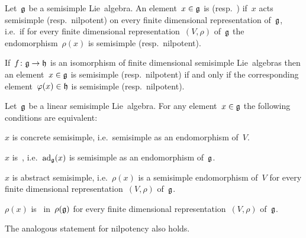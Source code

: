 \begin{definition}
  Let~$\mathfrak{g}$ be a semisimple Lie~algebra.
  An element~$x \in \mathfrak{g}$ is  (resp.\ ) if~$x$ acts semisimple (resp.\ nilpotent) on every finite dimensional representation of~$\mathfrak{g}$, i.e.\ if for every finite dimensional representation~$(V,\rho)$ of~$\mathfrak{g}$ the endomorphism~$\rho(x)$ is semisimple (resp.\ nilpotent).
\end{definition}


\begin{remark}
  If~$f \colon \mathfrak{g} \to \mathfrak{h}$ is an isomorphism of finite dimensional semisimple Lie~algebras then an element~$x \in \mathfrak{g}$ is semisimple (resp.\ nilpotent) if and only if the corresponding element~$\varphi(x) \in \mathfrak{h}$ is semisimple (resp.\ nilpotent).
\end{remark}


\begin{lemma}
  \label{characterizations of semisimple elements}
  Let~$\mathfrak{g}$ be a linear semisimple Lie~algebra.
  For any element~$x \in \mathfrak{g}$ the following conditions are equivalent:
  \begin{equivalenceslist}
    \item
      \label{concrete semisimple}
      $x$ is concrete semisimple, i.e.\ semisimple as an endomorphism of~$V$.
    \item
      \label{adsemisimple}
      $x$ is~{\adsemisimple}, i.e.~$\operatorname{ad}_{\mathfrak{g}}(x)$ is semisimple as an endomorphism of~$\mathfrak{g}$.
    \item
      \label{abstract semisimple}
      $x$ is abstract semisimple, i.e.~$\rho(x)$ is a semisimple endomorphism of~$V$ for every finite dimensional representation~$(V,\rho)$ of~$\mathfrak{g}$.
    \item
      \label{rep adsemisimple}
      $\rho(x)$ is~{\adsemisimple} in~$\rho(\mathfrak{g})$ for every finite dimensional representation~$(V,\rho)$ of~$\mathfrak{g}$.
  \end{equivalenceslist}
  The analogous statement for nilpotency also holds.
\end{lemma}


